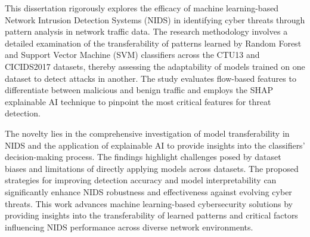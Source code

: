 \setlength{\parindent}{0pt}

This dissertation rigorously explores the efficacy of machine learning-based Network Intrusion Detection Systems (NIDS) in identifying cyber threats through pattern analysis in network traffic data. The research methodology involves a detailed examination of the transferability of patterns learned by Random Forest and Support Vector Machine (SVM) classifiers across the CTU13 and CICIDS2017 datasets, thereby assessing the adaptability of models trained on one dataset to detect attacks in another. The study evaluates flow-based features to differentiate between malicious and benign traffic and employs the SHAP explainable AI technique to pinpoint the most critical features for threat detection.

The novelty lies in the comprehensive investigation of model transferability in NIDS and the application of explainable AI to provide insights into the classifiers' decision-making process. The findings highlight challenges posed by dataset biases and limitations of directly applying models across datasets. The proposed strategies for improving detection accuracy and model interpretability can significantly enhance NIDS robustness and effectiveness against evolving cyber threats. This work advances machine learning-based cybersecurity solutions by providing insights into the transferability of learned patterns and critical factors influencing NIDS performance across diverse network environments.